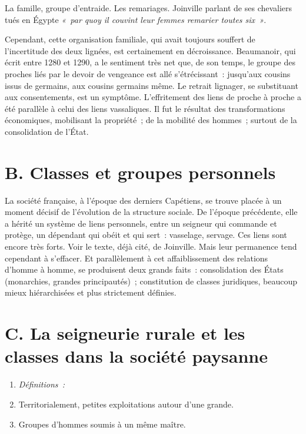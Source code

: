 \documentclass[french,twoside]{book} %
\newlength{\listmod}
\newcommand{\listhead}[1]{\hspace{-1\listmod}\emph{#1}}
\begin{document}
La famille, groupe d’entraide. Les remariages. Joinville parlant de ses chevaliers tués en Égypte \emph{« par quoy il couvint leur femmes remarier toutes six »}.\par
Cependant, cette organisation familiale, qui avait toujours souffert de l’incertitude des deux lignées, est certainement en décroissance. Beaumanoir, qui écrit entre 1280 et 1290, a le sentiment très net que, de son temps, le groupe des proches liés par le devoir de vengeance est allé s’étrécissant : jusqu’aux cousins issus de germains, aux cousins germains même. Le retrait lignager, se substituant aux consentements, est un symptôme. L’effritement des liens de proche à proche a été parallèle à celui des liens vassaliques. Il fut le résultat des transformations économiques, mobilisant la propriété ; de la mobilité des hommes ; surtout de la consolidation de l’État.
\section[{B. Classes et groupes personnels}]{B. Classes et groupes personnels}
\label{c07b}
\noindent La société française, à l’époque des derniers Capétiens, se trouve placée à un moment décisif de l’évolution de la structure sociale. De l’époque précédente, elle a hérité un système de liens personnels, entre un seigneur qui commande et protège, un dépendant qui obéit et qui sert : vasselage, servage. Ces liens sont encore très forts. Voir le texte, déjà cité, de Joinville. Mais leur permanence tend cependant à s’effacer. Et parallèlement à cet affaiblissement des relations d’homme à homme, se produisent deux grands faits : consolidation des États (monarchies, grandes principautés) ; constitution de classes juridiques, beaucoup mieux hiérarchisées et plus strictement définies.
\section[{C. La seigneurie rurale et les classes dans la société paysanne }]{C. La seigneurie rurale et les classes dans la société paysanne \protect\footnotemark }
\label{c07c}

\begin{enumerate}[itemsep=0pt,]
\item[]\listhead{Définitions :}
\item Territorialement, petites exploitations autour d’une grande.
\item Groupes d’hommes soumis à un même maître.
\end{enumerate}
\end{document}
